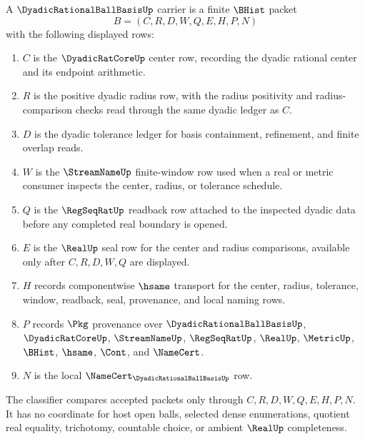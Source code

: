 \begin{definition}
\label{def:dyadic-rational-ball-basis-carrier}
A $\DyadicRationalBallBasisUp$ carrier is a finite $\BHist$ packet
$$
B=(C,R,D,W,Q,E,H,P,N)
$$
with the following displayed rows:
\begin{enumerate}
\item $C$ is the $\DyadicRatCoreUp$ center row, recording the dyadic rational center and its endpoint arithmetic.
\item $R$ is the positive dyadic radius row, with the radius positivity and radius-comparison checks read through the same dyadic ledger as $C$.
\item $D$ is the dyadic tolerance ledger for basis containment, refinement, and finite overlap reads.
\item $W$ is the $\StreamNameUp$ finite-window row used when a real or metric consumer inspects the center, radius, or tolerance schedule.
\item $Q$ is the $\RegSeqRatUp$ readback row attached to the inspected dyadic data before any completed real boundary is opened.
\item $E$ is the $\RealUp$ seal row for the center and radius comparisons, available only after $C,R,D,W,Q$ are displayed.
\item $H$ records componentwise $\hsame$ transport for the center, radius, tolerance, window, readback, seal, provenance, and local naming rows.
\item $P$ records $\Pkg$ provenance over $\DyadicRationalBallBasisUp$, $\DyadicRatCoreUp$, $\StreamNameUp$, $\RegSeqRatUp$, $\RealUp$, $\MetricUp$, $\BHist$, $\hsame$, $\Cont$, and $\NameCert$.
\item $N$ is the local $\NameCert_{\DyadicRationalBallBasisUp}$ row.
\end{enumerate}
The classifier compares accepted packets only through $C,R,D,W,Q,E,H,P,N$. It has no coordinate for host open balls, selected dense enumerations, quotient real equality, trichotomy, countable choice, or ambient $\RealUp$ completeness.
\end{definition}

